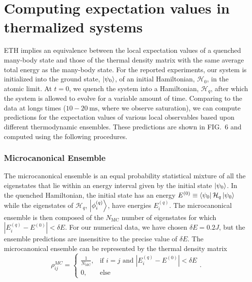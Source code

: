 \chapter{Computing expectation values in thermalized systems}
\label{AppendixA}

ETH implies an equivalence between the local expectation values of a quenched many-body state and those of the thermal density matrix with the same average total energy as the many-body state. 
For the reported experiments, our system is initialized into the ground
state, $\left|\psi_0\right\rangle$, of an initial Hamiltonian, $\mathcal H_0$, in the
atomic limit. At $t = 0$, we quench the system into a Hamiltonian, $\mathcal
H_q$, after which the system is allowed to evolve for a variable amount of
time. Comparing to the data at longs times ($10-20~\mathrm{ms}$, where we observe saturation), we can
compute predictions for the expectation values of various local observables
based upon different thermodynamic ensembles. These predictions are shown in
FIG.~6 and computed using the following procedures.


\subsection*{Microcanonical Ensemble}
The microcanonical ensemble is an equal probability statistical mixture of all
the eigenstates that lie within an energy interval given by the initial state
$\left|\psi_0\right\rangle$. In the quenched Hamiltonian, the initial state has an energy
$E^{(0)} \equiv \left\langle \psi_0\right| \mathcal H_q \left|\psi_0\right\rangle$ while the eigenstates of $\mathcal H_q$, $\left|\phi^{(q)}_i\right\rangle$, have energies
$E_i^{(q)}$. The microcanonical ensemble is then composed of the $N_\text{MC}$
number of eigenstates for which ${|E_i^{(q)} - E^{(0)}| < \delta E}$. For our numerical
data, we have chosen $\delta E = 0.2 J$, but the ensemble predictions are insensitive to the precise value of $\delta E$. The microcanonical ensemble can be represented by the
thermal density matrix
\begin{equation}
\rho_{ij}^{MC} = 
	\begin{cases} 
		\frac{1}{N_{\text{MC}}}, & \text{if $i = j$ and $|E_i^{(q)} - E^{(0)}| < \delta E$} \\
		0, & \text{else}
	\end{cases}.
\end{equation}

